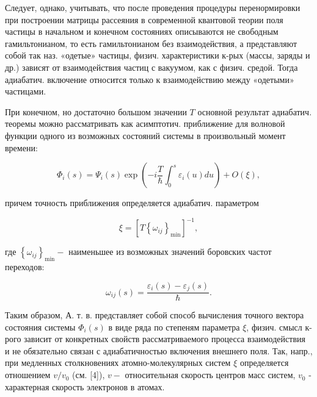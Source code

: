 \documentclass[10pt]{article}
\begin{document}
Следует, однако, учитывать, что после проведения процедуры перенормировки при построении матрицы рассеяния в современной квантовой теории поля частицы в начальном и конечном состояниях описываются не свободным гамильтонианом, то есть гамильтонианом без взаимодействия, а представляют собой так наз. «одетые» частицы, физич. характеристики к-рых (массы, заряды и др.) зависят от взаимодействия частиц с вакуумом, как с физич. средой. Тогда адиабатич. включение относится только к взаимодействию между «одетыми» частицами.



При конечном, но достаточно большом значении $T$ основной результат адиабатич. теоремы можно рассматривать как асимптотич. приближение для волновой функции одного из возможных состояний системы в произвольный момент времени:



\[

\Phi_{i}(s)=\Psi_{i}(s) \exp \left(-i \frac{T}{\hbar} \int_{0}^{s} \varepsilon_{i}(u) d u\right)+O(\xi),

\]



причем точность приближения определяется адиабатич. параметром



\[

\xi=\left[T\left\{\omega_{i j}\right\}_{\min }\right]^{-1},

\]



где $\left\{\omega_{i j}\right\}_{\min }-$ наименьшее из возможных значений боровских частот переходов:



\[

\omega_{i j}(s)=\frac{\varepsilon_{i}(s)-\varepsilon_{j}(s)}{\hbar} .

\]



Таким образом, А. т. в. представляет собой способ вычисления точного вектора состояния системы $\Phi_{i}(s)$ в виде ряда по степеням параметра $\xi$, физич. смысл к-рого зависит от конкретных свойств рассматриваемого процесса взаимодействия и не обязательно связан с адиабатичностью включения внешнего поля. Так, напр., при медленных столкновениях атомно-молекулярных систем $\xi$ определяется отношением $v / v_{0}$ (см. [4]), $v-$ относительная скорость центров масс систем, $v_{0}$ - характерная скорость электронов в атомах.
\end{document}
